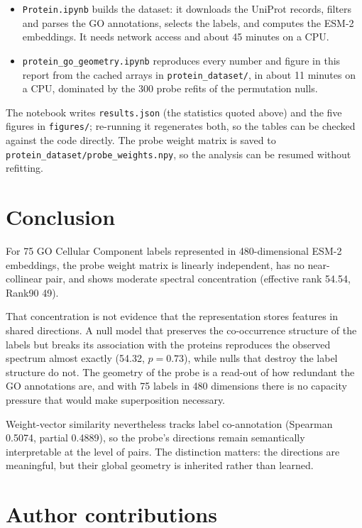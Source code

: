 \documentclass[11pt,a4paper]{article}
\begin{document}
\begin{itemize}[leftmargin=*]
    \item \texttt{Protein.ipynb} builds the dataset: it downloads the UniProt
    records, filters and parses the GO annotations, selects the labels, and computes
    the ESM-2 embeddings. It needs network access and about 45 minutes on a CPU.
    \item \texttt{protein\_go\_geometry.ipynb} reproduces every number and figure
    in this report from the cached arrays in \texttt{protein\_dataset/}, in about
    11 minutes on a CPU, dominated by the 300 probe refits of the permutation nulls.
\end{itemize}

The notebook writes \texttt{results.json} (the statistics quoted above) and the five
figures in \texttt{figures/}; re-running it regenerates both, so the tables can be
checked against the code directly. The probe weight matrix is saved to
\texttt{protein\_dataset/probe\_weights.npy}, so the analysis can be resumed
without refitting.

\section{Conclusion}

For 75 GO Cellular Component labels represented in 480-dimensional ESM-2
embeddings, the probe weight matrix is linearly independent, has no near-collinear
pair, and shows moderate spectral concentration (effective rank 54.54, Rank90 49).

That concentration is not evidence that the representation stores features in
shared directions. A null model that preserves the co-occurrence structure of the
labels but breaks its association with the proteins reproduces the observed
spectrum almost exactly (54.32, $p = 0.73$), while nulls that destroy the label
structure do not. The geometry of the probe is a read-out of how redundant the GO
annotations are, and with 75 labels in 480 dimensions there is no capacity pressure
that would make superposition necessary.

Weight-vector similarity nevertheless tracks label co-annotation (Spearman 0.5074,
partial 0.4889), so the probe's directions remain semantically interpretable at the
level of pairs. The distinction matters: the directions are meaningful, but their
global geometry is inherited rather than learned.

\section*{Author contributions}
\end{document}
